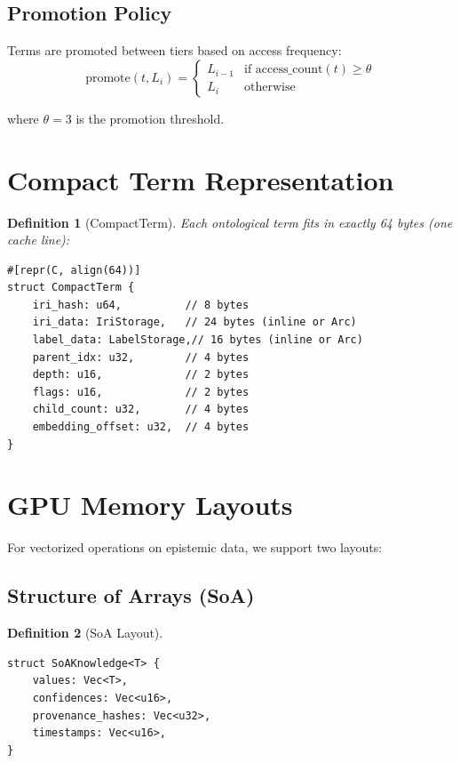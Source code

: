 \documentclass[11pt]{article}
\newtheorem{definition}{Definition}
\begin{document}
\subsection{Promotion Policy}

Terms are promoted between tiers based on access frequency:
\[
\text{promote}(t, L_i) =
\begin{cases}
L_{i-1} & \text{if access\_count}(t) \geq \theta \\
L_i & \text{otherwise}
\end{cases}
\]

where $\theta = 3$ is the promotion threshold.

\section{Compact Term Representation}

\begin{definition}[CompactTerm]
Each ontological term fits in exactly 64 bytes (one cache line):
\begin{verbatim}
#[repr(C, align(64))]
struct CompactTerm {
    iri_hash: u64,          // 8 bytes
    iri_data: IriStorage,   // 24 bytes (inline or Arc)
    label_data: LabelStorage,// 16 bytes (inline or Arc)
    parent_idx: u32,        // 4 bytes
    depth: u16,             // 2 bytes
    flags: u16,             // 2 bytes
    child_count: u32,       // 4 bytes
    embedding_offset: u32,  // 4 bytes
}
\end{verbatim}
\end{definition}

\section{GPU Memory Layouts}

For vectorized operations on epistemic data, we support two layouts:

\subsection{Structure of Arrays (SoA)}

\begin{definition}[SoA Layout]
\begin{verbatim}
struct SoAKnowledge<T> {
    values: Vec<T>,
    confidences: Vec<u16>,
    provenance_hashes: Vec<u32>,
    timestamps: Vec<u16>,
}
\end{verbatim}
\end{definition}
\end{document}
